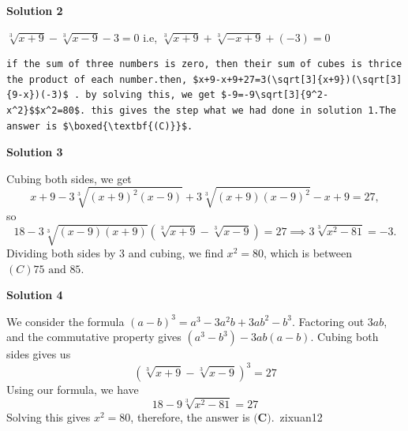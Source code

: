 \begin{enumerate}
 


 



\textbf{Solution 2}

$\sqrt[3]{x+9}-\sqrt[3]{x-9}-3=0$ i.e, $\sqrt[3]{x+9}+\sqrt[3]{-x+9}+(-3)=0$
\begin{verbatim}
if the sum of three numbers is zero, then their sum of cubes is thrice the product of each number.then, $x+9-x+9+27=3(\sqrt[3]{x+9})(\sqrt[3]{9-x})(-3)$ . by solving this, we get $-9=-9\sqrt[3]{9^2-x^2}$$x^2=80$. this gives the step what we had done in solution 1.The answer is $\boxed{\textbf{(C)}}$.
\end{verbatim}





\textbf{Solution 3}

Cubing both sides, we get
 \[x+9-3\sqrt[3]{(x+9)^2(x-9)}+3\sqrt[3]{(x+9)(x-9)^2}-x+9=27,\]so 
 \[18-3\sqrt[3]{(x-9)(x+9)}(\sqrt[3]{x+9}-\sqrt[3]{x-9})=27\implies 3\sqrt[3]{x^2-81}=-3.\] Dividing both sides by 3 and cubing, we find $x^2=80$, which is between $\boxed{(C)75\text{ and }85}$.

 



\textbf{Solution 4}

We consider the formula $(a-b)^3 = a^3 - 3a^2b + 3ab^2 - b^3$. Factoring out $3ab$, and the commutative property gives $(   a^3 - b^3) - 3ab(a-b)$. Cubing both sides gives us
 \[(\sqrt[3]{x+9}-\sqrt[3]{x-9})^3=27\]Using our formula, we have
 \[18 - 9 \sqrt[3]{x^2 - 81} = 27\]Solving this gives $x^2 = 80$, therefore, the answer is $\boxed{\textbf{(C)}}$.~zixuan12

 


\end{enumerate}